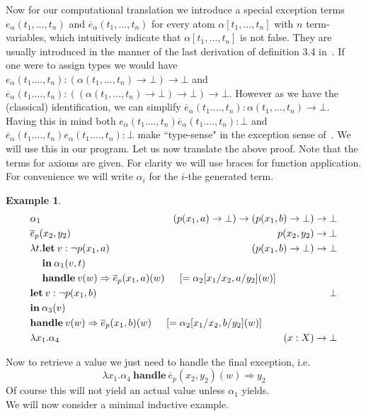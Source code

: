\documentclass[onehalfspacing]{article}
\newtheorem{example}[theorem]{Example}
\begin{document}
Now for our computational translation we introduce a special exception terms $e_\alpha(t_1,\dots,t_n)$ and $\overline e_\alpha(t_1,\dots,t_n)$ for every atom $\alpha[t_1,\dots,t_n]$ with $n$ term-variables, which intuitively indicate that $\alpha[t_1,\dots,t_n]$ is not false. They are usually introduced in the manner of the last derivation of definition 3.4 in~\cite{de_Groote_1995}. If one were to assign types we would have $e_\alpha(t_1.\dots,t_n) : (\alpha(t_1,\dots,t_n)\to\bot)\to\bot$ and $\overline e_\alpha(t_1.\dots,t_n) : ((\alpha(t_1,\dots,t_n)\to\bot)\to\bot)\to\bot$. However as we have the (classical) identification, we can simplify $\overline e_\alpha(t_1.\dots,t_n) : \alpha(t_1,\dots,t_n)\to\bot$. Having this in mind both $e_\alpha(t_1.\dots,t_n) \overline e_\alpha(t_1.\dots,t_n) : \bot$ and $\overline e_\alpha(t_1.\dots,t_n) e_\alpha(t_1.\dots,t_n) : \bot$ make ``type-sense" in the exception sense of~\cite{de_Groote_1995}. We will use this in our program. Let us now translate the above proof. Note that the terms for axioms are given. For clarity we will use braces for function application. For convenience we will write $\alpha_i$ for the $i$-the generated term.
\setcounter{equation}{0}
\begin{example}\hfill
	\begin{align}
		& \alpha_1 & (p(x_1,a)\to\bot)\to(p(x_1, b)\to\bot)\to\bot\\
		& \overline e_p(x_2, y_2) & p(x_2, y_2)\to\bot\\
		& \lambda t. \mathbf{let}\:v : \neg p(x_1, a)&(p(x_1, b)\to\bot)\to\bot\\
		& \phantom{\lambda t.}\mathbf{in}\:\alpha_1(v, t) &\nonumber\\
		& \phantom{\lambda t.}\mathbf{handle}\:v(w)\Rightarrow \overline e_p(x_1, a)(w)\indent [= \alpha_2[x_1/x_2, a/y_2](w)]\hspace*{-4cm}\nonumber&\\
		& \mathbf{let}\:v : \neg p(x_1, b)\:&\bot\\
		& \mathbf{in}\:\alpha_3(v) &\nonumber\\
		& \mathbf{handle}\:v(w)\Rightarrow \overline e_p(x_1, b)(w)\indent[= \alpha_2[x_1/x_2, b/y_2](w)]\hspace*{-4cm}\nonumber&\\
		& \lambda x_1.\alpha_4 &(x : X) \to \bot
	\end{align}
\end{example}

Now to retrieve a value we just need to handle the final exception, i.e.
$$\lambda x_1.\alpha_4\:\mathbf{handle}\: \overline{e}_p(x_2, y_2)(w)\Rightarrow y_2$$
Of course this will not yield an actual value unless $\alpha_1$ yields.\\
We will now consider a minimal inductive example.
\end{document}
